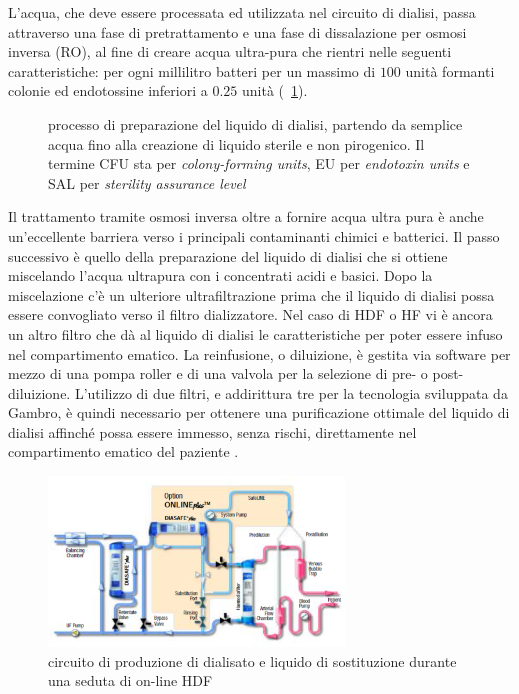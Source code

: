 L'acqua, che deve essere processata ed utilizzata nel circuito di dialisi, passa attraverso una fase di pretrattamento e una fase di dissalazione per osmosi inversa (RO), al fine di creare acqua ultra-pura che rientri nelle seguenti caratteristiche: per ogni millilitro batteri per un massimo di $100$ unità formanti colonie ed endotossine inferiori a $0.25$ unità (\figurename~\ref{acqua}). 
\begin{figure}[htb]
	\centering
		\caption{processo di preparazione del liquido di dialisi, partendo da semplice acqua fino alla creazione di liquido sterile e non pirogenico. Il termine CFU sta per \textit{colony-forming units}, EU per \textit{endotoxin units} e SAL per \textit{sterility assurance level}}\label{acqua}
\end{figure}
Il trattamento tramite osmosi inversa oltre a fornire acqua ultra pura è anche un'eccellente barriera verso i principali contaminanti chimici e batterici. Il passo successivo è quello della preparazione del liquido di dialisi che si ottiene miscelando l'acqua ultrapura con i concentrati acidi e basici. Dopo la miscelazione c'è un ulteriore ultrafiltrazione prima che il liquido di dialisi possa essere convogliato verso il filtro dializzatore.
Nel caso di HDF o HF vi è ancora un altro filtro che dà al liquido di dialisi le caratteristiche per poter essere infuso nel compartimento ematico. La reinfusione, o diluizione, è gestita via software per mezzo di una pompa roller e di una valvola per la selezione di pre- o post-diluizione. L'utilizzo di due filtri, e addirittura tre per la tecnologia sviluppata da Gambro, è quindi necessario per ottenere una purificazione ottimale del liquido di dialisi affinché possa essere immesso, senza rischi, direttamente nel compartimento ematico del paziente \cite{bib:tech}.
\begin{figure}[htb]
	\centering
		\includegraphics[width=0.7\textwidth]{immagini/NIC/circuito.eps}
		\caption{circuito di produzione di dialisato e liquido di sostituzione durante una seduta di on-line HDF}\label{circuito}
\end{figure}

